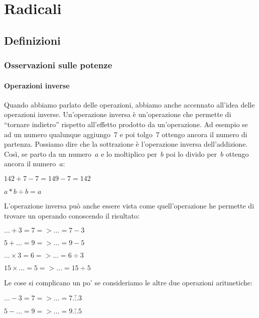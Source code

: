 
\chapter{Radicali}

\section{Definizioni}
\label{sec:radici_definizioni}

\subsection{Osservazioni sulle potenze}

\subsubsection{Operazioni inverse}

Quando abbiamo parlato delle operazioni, abbiamo anche accennato all'idea
delle operazioni inverse. Un'operazione inversa è un'operazione che permette
di ``tornare indietro'' rispetto all'effetto prodotto da un'operazione.
Ad esempio se ad un numero qualunque aggiungo~7 e poi tolgo~7 ottengo ancora il 
numero di partenza. Possiamo dire che la sottrazione è l'operazione inversa 
dell'addizione. Così, se parto da un numero~$a$ e lo moltiplico per~$b$ poi lo 
divido per~$b$ ottengo ancora il numero~$a$:

$142 + 7 - 7 = 149 -7 = 142$

$a * b \div b= a$

L'operazione inversa può anche essere vista come quell'operazione he permette 
di trovare un operando conoscendo il risultato:

$\dots + 3 = 7 => \dots = 7 - 3$

$5 + \dots = 9 => \dots = 9 - 5$

$\dots \times 3 = 6 => \dots = 6 \div 3$

$15 \times \dots = 5 => \dots = 15 \div 5$

Le cose si complicano un po' se consideriamo le altre due operazioni 
aritmetiche:

$\dots - 3 = 7 => \dots = 7 \overset{?}{\dots} 3$

$5 - \dots = 9 => \dots = 9 \overset{?}{\dots} 5$

